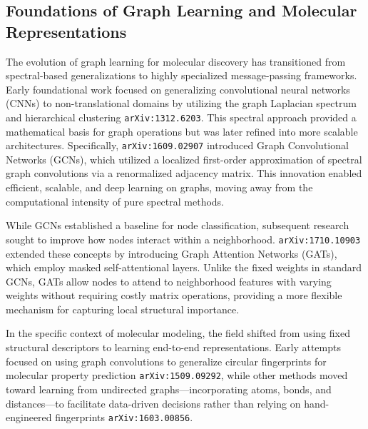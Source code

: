 \documentclass[11pt]{article}
\begin{document}
\subsection{Foundations of Graph Learning and Molecular Representations}

The evolution of graph learning for molecular discovery has transitioned from spectral-based generalizations to highly specialized message-passing frameworks. Early foundational work focused on generalizing convolutional neural networks (CNNs) to non-translational domains by utilizing the graph Laplacian spectrum and hierarchical clustering \texttt{arXiv:1312.6203}. This spectral approach provided a mathematical basis for graph operations but was later refined into more scalable architectures. Specifically, \texttt{arXiv:1609.02907} introduced Graph Convolutional Networks (GCNs), which utilized a localized first-order approximation of spectral graph convolutions via a renormalized adjacency matrix. This innovation enabled efficient, scalable, and deep learning on graphs, moving away from the computational intensity of pure spectral methods.

While GCNs established a baseline for node classification, subsequent research sought to improve how nodes interact within a neighborhood. \texttt{arXiv:1710.10903} extended these concepts by introducing Graph Attention Networks (GATs), which employ masked self-attentional layers. Unlike the fixed weights in standard GCNs, GATs allow nodes to attend to neighborhood features with varying weights without requiring costly matrix operations, providing a more flexible mechanism for capturing local structural importance.

In the specific context of molecular modeling, the field shifted from using fixed structural descriptors to learning end-to-end representations. Early attempts focused on using graph convolutions to generalize circular fingerprints for molecular property prediction \texttt{arXiv:1509.09292}, while other methods moved toward learning from undirected graphs—incorporating atoms, bonds, and distances—to facilitate data-driven decisions rather than relying on hand-engineered fingerprints \texttt{arXiv:1603.00856}.
\end{document}

